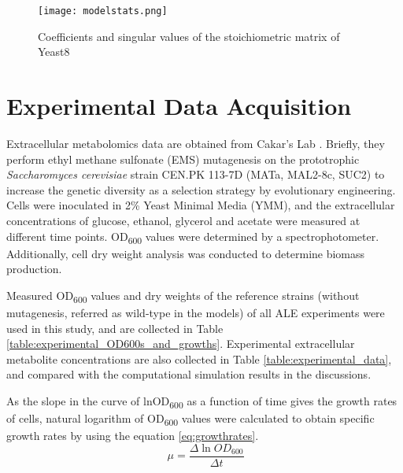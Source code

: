 \begin{figure}[H]
\begin{center}
\texttt{[image: modelstats.png]}
\end{center}
\caption[Coefficients and singular values of the stoichiometric matrix of Yeast8]{Coefficients and singular values of the stoichiometric matrix of Yeast8}
\label{fig:modelstats}
\end{figure}



\section{Experimental Data Acquisition} \label{experimentaldataacquisition}
Extracellular metabolomics data are obtained from Cakar's Lab \cite{arslan2018physiological}. Briefly, they perform ethyl methane sulfonate (EMS) mutagenesis  on the prototrophic \emph{Saccharomyces cerevisiae} strain CEN.PK 113-7D (MATa, MAL2-8c, SUC2) to increase the genetic diversity as a selection strategy by evolutionary engineering. Cells were inoculated in 2\% Yeast Minimal Media (YMM), and the extracellular concentrations of glucose, ethanol, glycerol and acetate were measured at different time points. OD\textsubscript{600} values were determined by a spectrophotometer. Additionally, cell dry weight analysis was conducted to determine biomass production.

Measured OD\textsubscript{600} values and dry weights of the reference strains (without mutagenesis, referred as wild-type in the models) of all ALE experiments were used in this study, and are collected in  Table \ref{table:experimental_OD600s_and_growths}. Experimental extracellular metabolite concentrations are also collected in Table \ref{table:experimental_data}, and compared with the computational simulation results in the discussions.




As the slope in the curve of lnOD\textsubscript{600} as a function of time gives the growth rates of cells, natural logarithm of OD\textsubscript{600} values were calculated to obtain specific growth rates by using the equation \ref{eq:growthrates}.
  \begin{equation}
      \ \mu = \frac{\Delta \ln{OD_{600}}}{\Delta t}
      \label{eq:growthrates}
  \end{equation}

